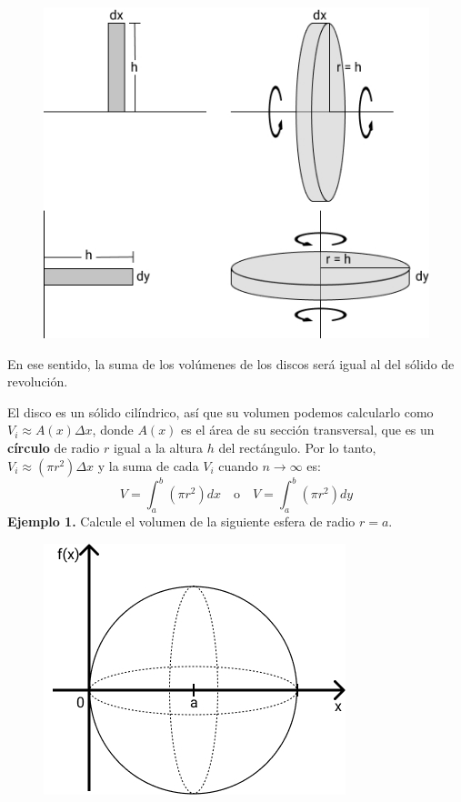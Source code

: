 \documentclass[12pt]{article}
\begin{document}
\begin{figure}[hbt!]
\centering
\includegraphics[scale=0.5]{img/disk-method-3.jpg}
\end{figure}

En ese sentido, la suma de los volúmenes de los discos será igual al del sólido de revolución.

El disco es un sólido cilíndrico, así que su volumen podemos calcularlo como $V_{i} \approx A(x) \Delta x$, donde $A(x)$ es el área de su sección transversal, que es un \textbf{círculo} de radio $r$ igual a la altura $h$ del rectángulo. Por lo tanto, $V_{i} \approx (\pi r^{2}) \Delta x$ y la suma de cada $V_{i}$ cuando $n \to \infty$ es:
\[
  V = \int_{a}^{b} (\pi r^{2}) dx \quad \text{o} \quad V = \int_{a}^{b} (\pi r^{2}) dy
\]
\textbf{Ejemplo 1.} \quad Calcule el volumen de la siguiente esfera de radio $r = a$.

\begin{figure}[hbt!]
\centering
\includegraphics[scale=0.5]{img/sphere-example-1.jpg}
\end{figure}
\end{document}
